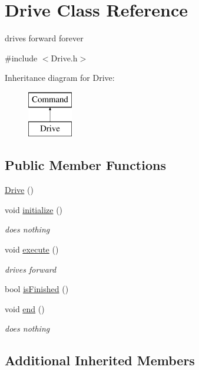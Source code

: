 \hypertarget{classDrive}{\section{Drive Class Reference}
\label{classDrive}
}


drives forward forever  




{\ttfamily \#include $<$Drive.\-h$>$}

Inheritance diagram for Drive\-:\begin{figure}[H]
\begin{center}
\leavevmode
\includegraphics[height=2.000000cm]{classDrive}
\end{center}
\end{figure}
\subsection*{Public Member Functions}
\begin{DoxyCompactItemize}
\item 
\hyperlink{classDrive_af18ec3b1c1c6603185fd4f2c9d5d6ac6}{Drive} ()
\item 
void \hyperlink{classDrive_af986858a5eebcca5a80569d7d4174c7f}{initialize} ()
\begin{DoxyCompactList}\small\item\em does nothing \end{DoxyCompactList}\item 
void \hyperlink{classDrive_acda08e791c3016be8336a888d4baab3d}{execute} ()
\begin{DoxyCompactList}\small\item\em drives forward \end{DoxyCompactList}\item 
bool \hyperlink{classDrive_a8f75240bfe7e8ca61f48bf6c322a3e6c}{is\-Finished} ()
\item 
void \hyperlink{classDrive_aa52dc86430f29f4ddc7c6b7c35bd2232}{end} ()
\begin{DoxyCompactList}\small\item\em does nothing \end{DoxyCompactList}\end{DoxyCompactItemize}
\subsection*{Additional Inherited Members}


